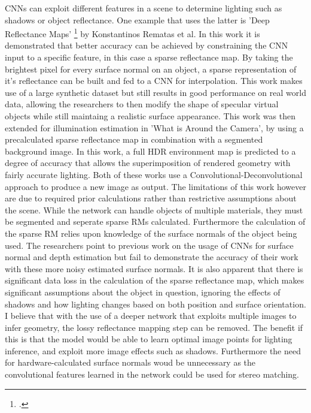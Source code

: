 \documentclass[ %
                    author={Gavin Parker},
                supervisor={Dr. Neill Campbell},
                    degree={MEng},
                     title={Deep Siamese Networks for Illumination Estimation from Stereo Images},
                  subtitle={},
                      type={research},
                      year={2018} ]{dissertation}
\begin{document}
CNNs can exploit different features in a scene to determine lighting such as shadows or object reflectance. One example that uses the latter is 'Deep Reflectance Maps' \footcite{https://arxiv.org/pdf/1511.04384.pdf} by Konstantinos Rematas et al. In this work it is demonstrated that better accuracy can be achieved by constraining the CNN input to a specific feature, in this case a sparse reflectance map. By taking the brightest pixel for every surface normal on an object, a sparse representation of it's reflectance can be built and fed to a CNN for interpolation. This work makes use of a large synthetic dataset but still results in good performance on real world data, allowing the researchers to then modify the shape of specular virtual objects while still maintaing a realistic surface appearance. This work was then extended for illumination estimation in 'What is Around the Camera', by using a precalculated sparse reflectance map in combination with a segmented background image. In this work, a full HDR environment map is predicted to a degree of accuracy that allows the superimposition of rendered geometry with fairly accurate lighting. Both of these works use a Convolutional-Deconvolutional approach to produce a new image as output. The limitations of this work however are due to required prior calculations rather than restrictive assumptions about the scene. While the network can handle objects of multiple materials, they must be segmented and seperate sparse RMs calculated. Furthermore the calculation of the sparse RM relies upon knowledge of the surface normals of the object being used. The researchers point to previous work  on the usage of CNNs for surface normal and depth estimation but fail to demonstrate the accuracy of their work with these more noisy estimated surface normals. It is also apparent that there is significant data loss in the calculation of the sparse reflectance map, which makes significant assumptions about the object in question, ignoring the effects of shadows and how lighting changes based on both position and surface orientation. I believe that with the use of a deeper network that exploits multiple images to infer geometry, the lossy reflectance mapping step can be removed. The benefit if this is that the model would be able to learn optimal image points for lighting inference, and exploit more image effects such as shadows. Furthermore the need for hardware-calculated surface normals woud be unnecessary as the convolutional features learned in the network could be used for stereo matching.
\end{document}
